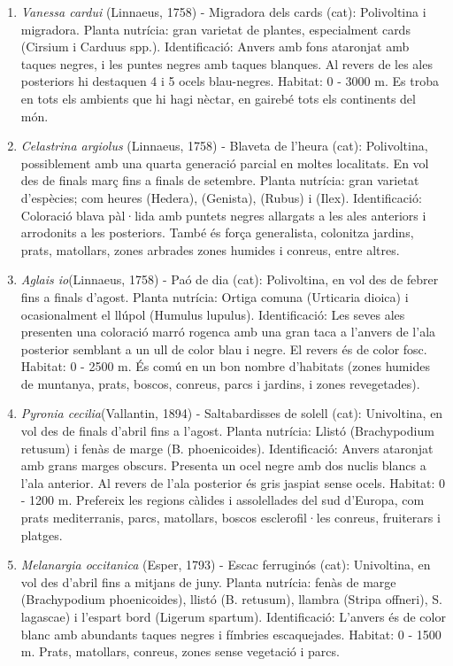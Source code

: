 \documentclass{article}
\begin{document}
\begin{enumerate}
    \item {\it Vanessa cardui} (Linnaeus, 1758) - Migradora dels cards (cat): Polivoltina i migradora. Planta nutrícia: gran varietat de plantes, especialment cards (Cirsium i Carduus spp.). Identificació: Anvers amb fons ataronjat amb taques negres, i les puntes negres amb taques blanques. Al revers de les ales posteriors hi destaquen 4 i 5 ocels blau-negres. Habitat: 0 - 3000 m. Es troba en tots els ambients que hi hagi nèctar, en gairebé tots els continents del món.

    
    \item {\it Celastrina argiolus} (Linnaeus, 1758) - Blaveta de l'heura (cat): Polivoltina, possiblement amb una quarta generació parcial en moltes localitats. En vol des de finals març fins a finals de setembre. Planta nutrícia: gran varietat d'espècies; com heures (Hedera), (Genista), (Rubus) i (Ilex). Identificació: Coloració blava pàl·lida amb puntets negres allargats a les ales anteriors i arrodonits a les posteriors. També és força generalista, colonitza jardins, prats, matollars, zones arbrades zones humides i conreus, entre altres.
    
    \item {\it Aglais io}(Linnaeus, 1758) - Paó de dia (cat): Polivoltina, en vol des de febrer fins a finals d'agost. Planta nutrícia: Ortiga comuna (Urticaria dioica) i ocasionalment el llúpol (Humulus lupulus). Identificació: Les seves ales presenten una coloració marró rogenca amb una gran taca a l'anvers de l'ala posterior semblant a un ull de color blau i negre. El revers és de color fosc. Habitat: 0 - 2500 m. És comú en un bon nombre d'habitats (zones humides de muntanya, prats, boscos, conreus, parcs i jardins, i zones revegetades). 
    
    \item {\it Pyronia cecilia}(Vallantin, 1894) - Saltabardisses de solell (cat): Univoltina, en vol des de finals d'abril fins a l'agost. Planta nutrícia: Llistó (Brachypodium retusum) i fenàs de marge (B. phoenicoides). Identificació: Anvers ataronjat amb grans marges obscurs. Presenta un ocel negre amb dos nuclis blancs a l'ala anterior. Al revers de l'ala posterior és gris jaspiat sense ocels. Habitat: 0 - 1200 m. Prefereix les regions càlides i assolellades del sud d'Europa, com prats mediterranis, parcs, matollars, boscos esclerofil·les conreus, fruiterars i platges.
    
    \item {\it Melanargia occitanica} (Esper, 1793) - Escac ferruginós (cat): Univoltina, en vol des d'abril fins a mitjans de juny. Planta nutrícia: fenàs de marge (Brachypodium phoenicoides), llistó (B. retusum), llambra (Stripa offneri), S. lagascae) i l'espart bord (Ligerum spartum). Identificació: L'anvers és de color blanc amb abundants taques negres i fímbries escaquejades. Habitat: 0 - 1500 m.  Prats, matollars, conreus, zones sense vegetació i parcs.


\end{enumerate}
\end{document}

